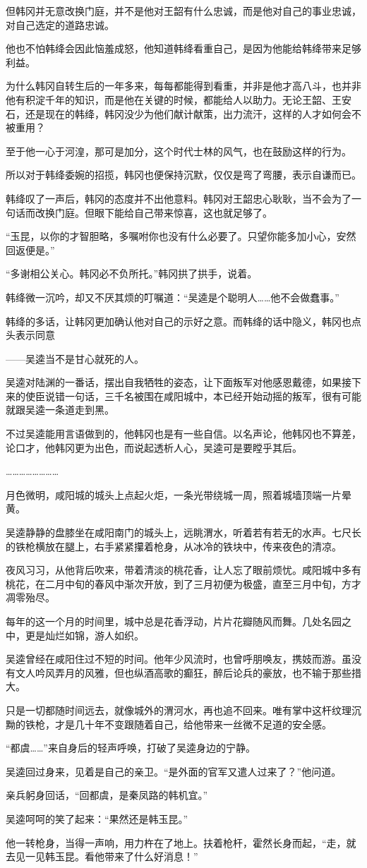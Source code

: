 但韩冈并无意改换门庭，并不是他对王韶有什么忠诚，而是他对自己的事业忠诚，对自己选定的道路忠诚。

他也不怕韩绛会因此恼羞成怒，他知道韩绛看重自己，是因为他能给韩绛带来足够利益。

为什么韩冈自转生后的一年多来，每每都能得到看重，并非是他才高八斗，也并非他有积淀千年的知识，而是他在关键的时候，都能给人以助力。无论王韶、王安石，还是现在的韩绛，韩冈没少为他们献计献策，出力流汗，这样的人才如何会不被重用？

至于他一心于河湟，那可是加分，这个时代士林的风气，也在鼓励这样的行为。

所以对于韩绛委婉的招揽，韩冈也便保持沉默，仅仅是弯了弯腰，表示自谦而已。

韩绛叹了一声后，韩冈的态度并不出他意料。韩冈对王韶忠心耿耿，当不会为了一句话而改换门庭。但眼下能给自己带来惊喜，这也就足够了。

“玉昆，以你的才智胆略，多嘱咐你也没有什么必要了。只望你能多加小心，安然回返便是。”

“多谢相公关心。韩冈必不负所托。”韩冈拱了拱手，说着。

韩绛微一沉吟，却又不厌其烦的叮嘱道：“吴逵是个聪明人……他不会做蠢事。”

韩绛的多话，让韩冈更加确认他对自己的示好之意。而韩绛的话中隐义，韩冈也点头表示同意

——吴逵当不是甘心就死的人。

吴逵对陆渊的一番话，摆出自我牺牲的姿态，让下面叛军对他感恩戴德，如果接下来的使臣说错一句话，三千名被围在咸阳城中，本已经开始动摇的叛军，很有可能就跟吴逵一条道走到黑。

不过吴逵能用言语做到的，他韩冈也是有一些自信。以名声论，他韩冈也不算差，论口才，他韩冈更为出色，而说起透析人心，吴逵可是要瞠乎其后。

……………………

月色微明，咸阳城的城头上点起火炬，一条光带绕城一周，照着城墙顶端一片晕黄。

吴逵静静的盘膝坐在咸阳南门的城头上，远眺渭水，听着若有若无的水声。七尺长的铁枪横放在腿上，右手紧紧攥着枪身，从冰冷的铁块中，传来夜色的清凉。

夜风习习，从他背后吹来，带着清淡的桃花香，让人忘了眼前烦忧。咸阳城中多有桃花，在二月中旬的春风中渐次开放，到了三月初便为极盛，直至三月中旬，方才凋零殆尽。

每年的这一个月的时间里，城中总是花香浮动，片片花瓣随风而舞。几处名园之中，更是灿烂如锦，游人如织。

吴逵曾经在咸阳住过不短的时间。他年少风流时，也曾呼朋唤友，携妓而游。虽没有文人吟风弄月的风雅，但也纵酒高歌的癫狂，醉后论兵的豪放，也不输于那些措大。

只是一切都随时间远去，就像城外的渭河水，再也追不回来。唯有掌中这杆纹理沉黝的铁枪，才是几十年不变跟随着自己，给他带来一丝微不足道的安全感。

“都虞……”来自身后的轻声呼唤，打破了吴逵身边的宁静。

吴逵回过身来，见着是自己的亲卫。“是外面的官军又遣人过来了？”他问道。

亲兵躬身回话，“回都虞，是秦凤路的韩机宜。”

吴逵呵呵的笑了起来：“果然还是韩玉昆。”

他一转枪身，当得一声响，用力杵在了地上。扶着枪杆，霍然长身而起，“走，就去见一见韩玉昆。看他带来了什么好消息！”

